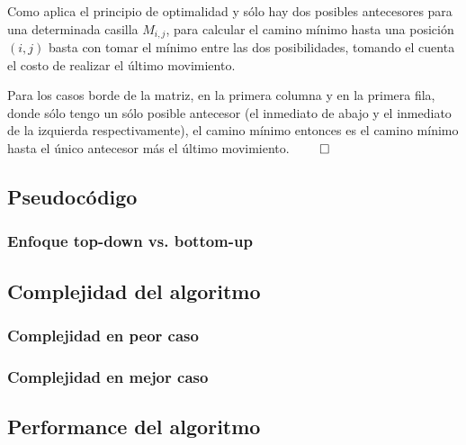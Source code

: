 Como aplica el principio de optimalidad y sólo hay dos posibles antecesores para una determinada casilla $M_{i,j}$, para calcular el camino mínimo hasta una posición $(i,j)$ basta con tomar el mínimo entre las dos posibilidades, tomando el cuenta el costo de realizar el último movimiento.

Para los casos borde de la matriz, en la primera columna y en la primera fila, donde sólo tengo un sólo posible antecesor (el inmediato de abajo y el inmediato de la izquierda respectivamente), el camino mínimo entonces es el camino mínimo hasta el único antecesor más el último movimiento. $\qed$

\subsection{Pseudocódigo}


\subsubsection{Enfoque top-down vs. bottom-up}


\subsection{Complejidad del algoritmo}

\subsubsection{Complejidad en peor caso}

\subsubsection{Complejidad en mejor caso}

\subsection{Performance del algoritmo}

